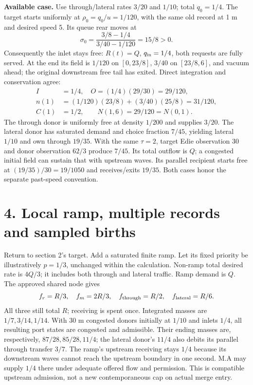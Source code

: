 \documentclass[11pt,a4paper]{article}
\begin{document}
\textbf{Available case.} Use through/lateral rates $3/20$ and $1/10$; total
$q_0=1/4$. The target starts uniformly at $\rho_0=q_0/u=1/120$, with the
same old record at 1 m and desired speed 5. Its queue rear moves at
\begin{equation}
 \sigma_0=\frac{3/8-1/4}{3/40-1/120}=15/8>0.
\end{equation}
Consequently the inlet stays free: $R(t)=Q$, $q_{\rm in}=1/4$, both
requests are fully served. At the end its field is $1/120$ on $[0,23/8]$,
$3/40$ on $[23/8,6]$, and vacuum ahead; the original downstream free tail
has exited. Direct integration and conservation agree:
\begin{align}
 I&=1/4,\quad O=(1/4)(29/30)=29/120,\\
 n(1)&=(1/120)(23/8)+(3/40)(25/8)=31/120,\\
 C(1)&=1/2,\qquad N(1,6)=29/120=N(0,1).
\end{align}
The through donor is uniformly free at density $1/200$ and supplies $3/20$.
The lateral donor has saturated demand and choice fraction $7/45$, yielding
lateral $1/10$ and own through $19/35$. With the same $\tau=2$, target
Edie observation 30 and donor observation $62/3$ produce $7/45$. Its total
outflow is $Q$; a congested initial field can sustain that with upstream
waves. Its parallel recipient starts free at $(19/35)/30=19/1050$ and
receives/exits $19/35$. Both cases honor the separate past-speed convention.

\newpage
\section*{4. Local ramp, multiple records and sampled births}
Return to section 2's target. Add a saturated finite ramp. Let its fixed
priority be illustratively $p=1/3$, unchanged within the calculation.
Non-ramp total desired rate is $4Q/3$; it includes both through and lateral
traffic. Ramp demand is $Q$. The approved shared node gives
\begin{equation}
 f_r=R/3,\quad f_m=2R/3,\quad
 f_{\rm through}=R/2,\quad f_{\rm lateral}=R/6.
\end{equation}
All three still total $R$; receiving is spent once. Integrated masses are
$1/7,3/14,1/14$. With 30 m congested donors initially at $1/10$ and
inlets $1/4$, all resulting port states are congested and admissible.
Their ending masses are, respectively, $87/28,85/28,11/4$; the lateral
donor's $11/4$ also debits its parallel through transfer $3/7$.
The ramp's upstream receiving stays $1/4$ because its downstream waves
cannot reach the upstream boundary in one second. M.A may supply $1/4$
there under adequate offered flow and permission. This is compatible upstream
admission, not a new contemporaneous cap on actual merge entry.
\end{document}
